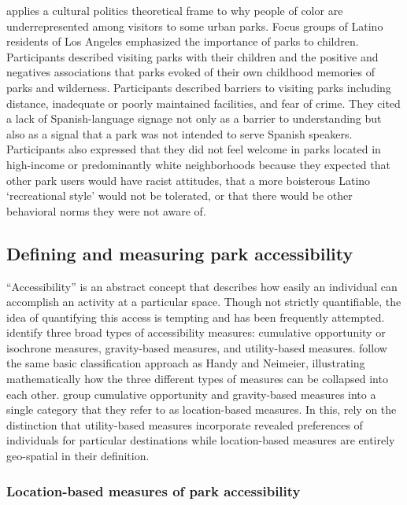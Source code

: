\documentclass[3p, authoryear, review]{elsarticle} %
\begin{document}
\citet{byrne2012green} applies a cultural politics theoretical frame to why people of
color are underrepresented among visitors to some urban parks. Focus groups of
Latino residents of Los Angeles emphasized the importance of parks to
children. Participants described visiting parks with their children and the
positive and negatives associations that parks evoked of their own childhood
memories of parks and wilderness. Participants described barriers to visiting
parks including distance, inadequate or poorly maintained facilities, and fear
of crime. They cited a lack of Spanish-language signage not only as a barrier
to understanding but also as a signal that a park was not intended to serve
Spanish speakers. Participants also expressed that they did not feel welcome
in parks located in high-income or predominantly white neighborhoods because
they expected that other park users would have racist attitudes, that a more
boisterous Latino `recreational style' would not be tolerated, or that there
would be other behavioral norms they were not aware of.

\hypertarget{defining-and-measuring-park-accessibility}{%
\subsection{Defining and measuring park accessibility}\label{defining-and-measuring-park-accessibility}}

``Accessibility'' is an abstract concept that describes how easily an individual
can accomplish an activity at a particular space. Though not strictly
quantifiable, the idea of quantifying this access is tempting and has been
frequently attempted. \citet{Handy1997} identify three broad types of accessibility
measures: cumulative opportunity or isochrone measures, gravity-based measures,
and utility-based measures. \citet{Dong2006} follow the same basic classification
approach as Handy and Neimeier, illustrating mathematically how the three
different types of measures can be collapsed into each other. \citet{GEURS2004127}
group cumulative opportunity and gravity-based measures into a single category
that they refer to as location-based measures. In this, \citet{GEURS2004127} rely on
the distinction that utility-based measures incorporate revealed preferences of
individuals for particular destinations while location-based measures are
entirely geo-spatial in their definition.

\hypertarget{location-based-measures-of-park-accessibility}{%
\subsubsection{Location-based measures of park accessibility}\label{location-based-measures-of-park-accessibility}}
\end{document}

